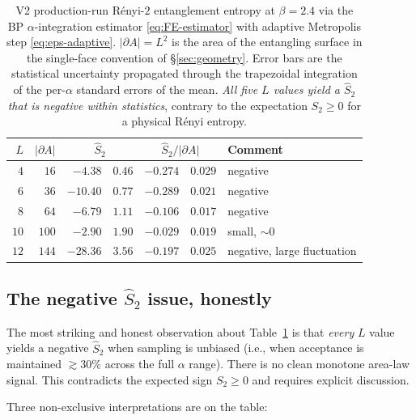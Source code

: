 \documentclass[11pt,a4paper]{article}
\theoremstyle{definition}
\begin{document}
\begin{table}[t]
\centering
\begin{tabular}{rrr@{$\;\pm\;$}lr@{$\;\pm\;$}ll}
\toprule
$L$ & $|\partial A|$
    & \multicolumn{2}{c}{$\widehat S_2$}
    & \multicolumn{2}{c}{$\widehat S_2/|\partial A|$}
    & Comment \\
\midrule
$4$  & $16$  & $-4.38$  & $0.46$ & $-0.274$ & $0.029$ & negative \\
$6$  & $36$  & $-10.40$ & $0.77$ & $-0.289$ & $0.021$ & negative \\
$8$  & $64$  & $-6.79$  & $1.11$ & $-0.106$ & $0.017$ & negative \\
$10$ & $100$ & $-2.90$  & $1.90$ & $-0.029$ & $0.019$ & small, $\sim 0$ \\
$12$ & $144$ & $-28.36$ & $3.56$ & $-0.197$ & $0.025$ & negative, large fluctuation \\
\bottomrule
\end{tabular}
\caption{V2 production-run Rényi-$2$ entanglement entropy at
$\beta = 2.4$ via the BP $\alpha$-integration estimator
\eqref{eq:FE-estimator} with adaptive Metropolis step
\eqref{eq:eps-adaptive}. $|\partial A| = L^{2}$ is the area of the
entangling surface in the single-face convention of
\S\ref{sec:geometry}. Error bars are the statistical uncertainty
propagated through the trapezoidal integration of the per-$\alpha$
standard errors of the mean. \emph{All five $L$ values yield a
$\widehat S_2$ that is negative within statistics}, contrary to the
expectation $S_2 \ge 0$ for a physical Rényi entropy.}
\label{tab:v2-results}
\end{table}

\subsection{The negative $\widehat S_2$ issue, honestly}
\label{sec:negative}

The most striking and honest observation about
Table~\ref{tab:v2-results} is that \emph{every} $L$ value yields a
negative $\widehat S_2$ when sampling is unbiased (i.e., when
acceptance is maintained $\gtrsim 30\%$ across the full $\alpha$
range). There is no clean monotone area-law signal. This contradicts
the expected sign $S_2 \ge 0$ and requires explicit discussion.

Three non-exclusive interpretations are on the table:
\end{document}
